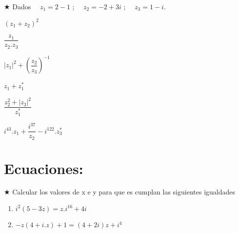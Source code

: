 \documentclass[a4paper,11pt,spanish,sans]{exam}
\begin{document}
\begin{enumerate}
\begin{minipage}{0.25\textwidth}
		\end{minipage}
		
	$\bigstar$	Dados $\quad z_1=2-1$ ;  $\quad z_2=-2+3i$ ;  $\quad z_3=1-i$.
	
	\end{enumerate}
	
		
	

\section{ Ecuaciones:}

$\bigstar$ Calcular los valores de x e y para que es cumplan las siguientes igualdades
\begin{enumerate}


Hallar el valor de z:
	\item $i^{2}(5-3z)=z.i^{16}+4i$
	\item $-z(4+i.z)+1=(4+2i)z+i^4$
\end{enumerate}
\end{document}
